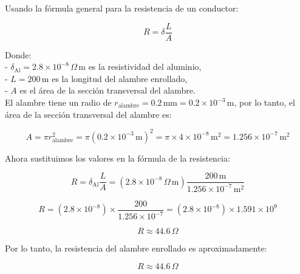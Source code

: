 \documentclass[answers]{exam} %
\begin{document}
\begin{questions}
	Usando la fórmula general para la resistencia de un conductor:

	\[
		R = \delta \frac{L}{A}
	\]

	Donde:\\
	- \(\delta_{\text{Al}} = 2.8 \times 10^{-8} \, \Omega \, \text{m}\) es la resistividad del aluminio,\\
	- \(L = 200 \, \text{m}\) es la longitud del alambre enrollado,\\
	- \(A\) es el área de la sección transversal del alambre.\\

	El alambre tiene un radio de \(r_{\text{alambre}} = 0.2 \, \text{mm} = 0.2 \times 10^{-3} \, \text{m}\), por lo tanto, el área de la sección transversal del alambre es:

	\[
		A = \pi r_{\text{alambre}}^2 = \pi (0.2 \times 10^{-3} \, \text{m})^2 = \pi \times 4 \times 10^{-8} \, \text{m}^2 = 1.256 \times 10^{-7} \, \text{m}^2
	\]

	Ahora sustituimos los valores en la fórmula de la resistencia:

	\[
		R = \delta_{\text{Al}} \frac{L}{A} = (2.8 \times 10^{-8} \, \Omega \, \text{m}) \frac{200 \, \text{m}}{1.256 \times 10^{-7} \, \text{m}^2}
	\]

	\[
		R = (2.8 \times 10^{-8}) \times \frac{200}{1.256 \times 10^{-7}} = (2.8 \times 10^{-8}) \times 1.591 \times 10^{9}
	\]

	\[
		R \approx 44.6 \, \Omega
	\]

	Por lo tanto, la resistencia del alambre enrollado es aproximadamente:

	\[
		R \approx 44.6 \, \Omega
	\]

\end{questions}
\end{document}

